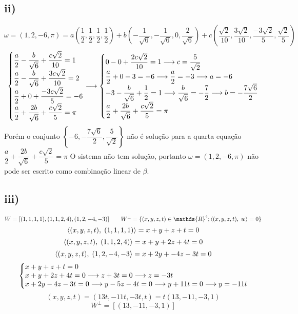 \documentclass[12pt]{article}
\begin{document}
\subsection{ii)}

\[\omega = (1,2,-6,\pi) = a\left( \dfrac{1}{2}, \dfrac{1}{2},\dfrac{1}{2},\dfrac{1}{2} \right) + b \left( -\dfrac{1}{\sqrt{6}}, -\dfrac{1}{\sqrt{6}}, 0, \dfrac{2}{\sqrt{6}} \right) + c \left( \dfrac{\sqrt{2}}{10}, \dfrac{3\sqrt{2}}{10}, \dfrac{-3\sqrt{2}}{5}, \dfrac{\sqrt{2}}{5} \right)\]
\[\left\{ \begin{array}{@{}l@{}}
	\dfrac{a}{2} - \dfrac{b}{\sqrt{6}} + \dfrac{c\sqrt{2}}{10} = 1\\
	\dfrac{a}{2} - \dfrac{b}{\sqrt{6}} + \dfrac{3c\sqrt{2}}{10} = 2\\
	\dfrac{a}{2} + 0                   + \dfrac{-3c\sqrt{2}}{5} = -6\\
	\dfrac{a}{2} +\dfrac{2b}{\sqrt{6}} + \dfrac{c\sqrt{2}}{5} = \pi\\
\end{array} \right. \longrightarrow
\left\{ \begin{array}{@{}l@{}}
	0            - 0                   + \dfrac{2c\sqrt{2}}{10} = 1 \longrightarrow c = \dfrac{5}{\sqrt{2}}\\
	\dfrac{a}{2} + 0                   - 3 = -6 \longrightarrow \dfrac{a}{2} = -3 \longrightarrow a = -6\\
	-3 -\dfrac{b}{\sqrt{6}} + \dfrac{1}{2} = 1 \longrightarrow \dfrac{b}{\sqrt{6}} = -\dfrac{7}{2} \longrightarrow b = -\dfrac{7\sqrt{6}}{2}\\
	\dfrac{a}{2} +\dfrac{2b}{\sqrt{6}} + \dfrac{c\sqrt{2}}{5} = \pi\\
\end{array} \right.\]
Porém o conjunto $\left\lbrace -6, -\dfrac{7\sqrt{6}}{2}, \dfrac{5}{\sqrt{2}} \right\rbrace$ não é solução para a quarta equação $\dfrac{a}{2} +\dfrac{2b}{\sqrt{6}} + \dfrac{c\sqrt{2}}{5} = \pi$
O sistema não tem solução, portanto $\omega = (1,2,-6,\pi)$ não pode ser escrito como combinação linear de $\beta$.















\subsection{iii)}

\[W=[(1,1,1,1),(1,1,2,4),(1,2,-4,-3)] \qquad W^{\perp} = \lbrace (x,y,z,t) \in \mathds{R}^{4} ; \p{(x,y,z,t)}{w} = 0\rbrace\]
\[\left\langle(x,y,z,t),\;(1,1,1,1)\right\rangle=x+y+z+t=0\]
\[\left\langle(x,y,z,t),\;(1,1,2,4)\right\rangle=x+y+2z+4t=0\]
\[\left\langle(x,y,z,t),\;(1,2,-4,-3\right\rangle=x+2y+-4z-3t=0\]
\[\left\{ \begin{array}{@{}l@{}}
	x+y+z+t=0\\
	x+y+2z+4t=0 \longrightarrow z+3t=0 \longrightarrow z=-3t\\
	x+2y-4z-3t=0 \longrightarrow y-5z-4t=0 \longrightarrow y+11t=0 \longrightarrow y=-11t
\end{array} \right.\]
\[(x,y,z,t) = (13t, -11t, -3t, t) = t(13,-11,-3,1)\]
\[W^{\perp} = [(13,-11,-3,1)]\]
\end{document}
